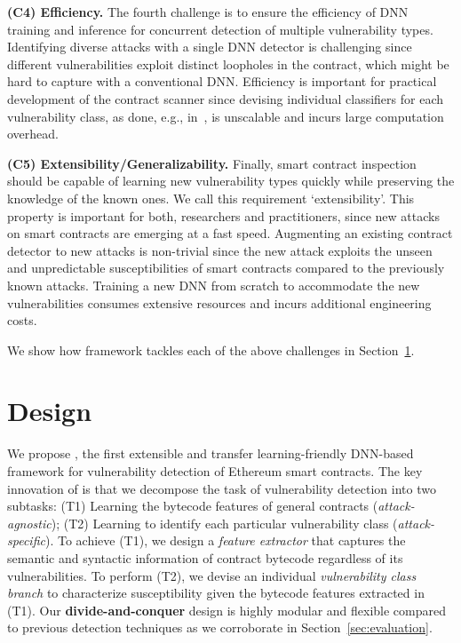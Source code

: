 \vspace{0.1em}
\textbf{(C4) Efficiency.} 
The fourth challenge is to ensure the efficiency of DNN training and inference for concurrent detection of multiple vulnerability types. Identifying diverse attacks with a single DNN detector is challenging since different vulnerabilities exploit distinct loopholes in the contract, which might be hard to capture with a conventional DNN.
Efficiency is important for practical development of the contract scanner since devising individual classifiers for each vulnerability class, as done, e.g., in~\cite{rw_contractward}, is unscalable and incurs large computation overhead. 

\vspace{0.2em}
\textbf{(C5) Extensibility/Generalizability.} 
Finally, smart contract inspection should be capable of learning new vulnerability types quickly while preserving the knowledge of the known ones. We call this requirement `extensibility'. 
This property is important for both, researchers and practitioners, since new attacks on smart contracts are emerging at a fast speed.
Augmenting an existing contract detector to new attacks is non-trivial since the new attack exploits the unseen and unpredictable susceptibilities of smart contracts compared to the previously known attacks.
Training a new DNN from scratch to accommodate the new vulnerabilities consumes extensive resources and incurs additional engineering costs. 

We show how \sys{} framework tackles each of the above challenges in Section~\ref{sec:design}. 
\vspace{-0.1em}
\section{\sys{} Design}
\label{sec:design}
We propose \sys{}, the first {extensible} and {transfer learning-friendly} DNN-based framework for vulnerability detection of Ethereum smart contracts. 
The key innovation of \sys{} is that we {decompose} the task of vulnerability detection into two subtasks: (T1) Learning the bytecode features of general contracts (\textit{attack-agnostic}); (T2) Learning to identify each particular vulnerability class (\textit{attack-specific}). To achieve (T1), we design a \textit{feature extractor} that captures the semantic and syntactic information of contract bytecode regardless of its vulnerabilities. To perform (T2), we devise an individual \textit{vulnerability class branch} to characterize susceptibility given the bytecode features extracted in (T1). Our \textbf{divide-and-conquer} design is highly modular and flexible compared to previous detection techniques as we corroborate in Section~\ref{sec:evaluation}. 

